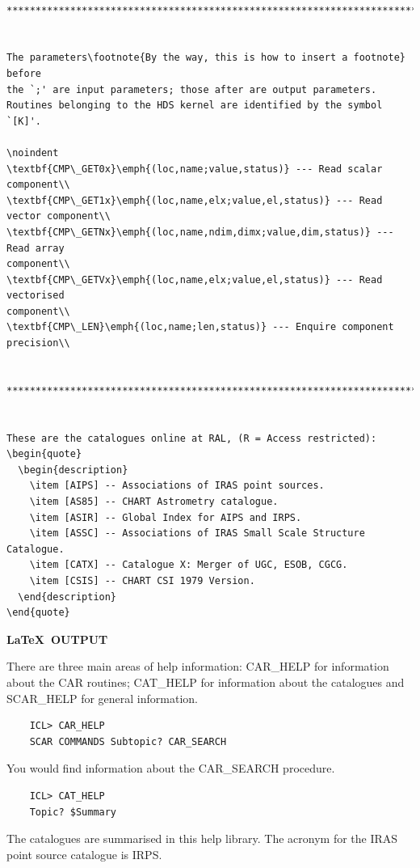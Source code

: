 \documentclass[twoside,11pt]{article}
\begin{document}
\begin{verbatim}

******************************************************************************


The parameters\footnote{By the way, this is how to insert a footnote} before
the `;' are input parameters; those after are output parameters.
Routines belonging to the HDS kernel are identified by the symbol `[K]'.

\noindent
\textbf{CMP\_GET0x}\emph{(loc,name;value,status)} --- Read scalar component\\
\textbf{CMP\_GET1x}\emph{(loc,name,elx;value,el,status)} --- Read vector component\\
\textbf{CMP\_GETNx}\emph{(loc,name,ndim,dimx;value,dim,status)} --- Read array 
component\\
\textbf{CMP\_GETVx}\emph{(loc,name,elx;value,el,status)} --- Read vectorised 
component\\
\textbf{CMP\_LEN}\emph{(loc,name;len,status)} --- Enquire component precision\\


******************************************************************************


These are the catalogues online at RAL, (R = Access restricted):
\begin{quote}
  \begin{description}
    \item [AIPS] -- Associations of IRAS point sources.
    \item [AS85] -- CHART Astrometry catalogue.
    \item [ASIR] -- Global Index for AIPS and IRPS.
    \item [ASSC] -- Associations of IRAS Small Scale Structure Catalogue.
    \item [CATX] -- Catalogue X: Merger of UGC, ESOB, CGCG.
    \item [CSIS] -- CHART CSI 1979 Version.
  \end{description}
\end{quote}
\end{verbatim}

\normalsize

\newpage

\begin{center}
  \textbf{\LaTeX\ OUTPUT}
\end{center}

There are three main areas of help information: CAR\_HELP for information 
about the CAR routines; CAT\_HELP for information about the catalogues and 
SCAR\_HELP for general information.
\begin{verbatim}
    ICL> CAR_HELP
    SCAR COMMANDS Subtopic? CAR_SEARCH
\end{verbatim}
You would find information about the CAR\_SEARCH procedure.
\begin{verbatim}
    ICL> CAT_HELP
    Topic? $Summary
\end{verbatim}
The catalogues are summarised in this help library.
The acronym for the IRAS point source catalogue is IRPS.
\end{document}
